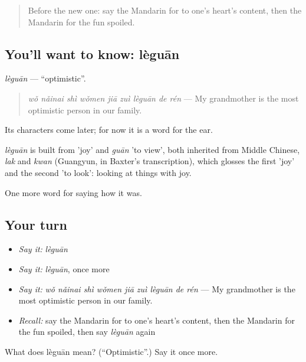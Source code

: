 \begin{quote}
Before the new one: say the Mandarin for to one's heart's content, then the Mandarin for the fun spoiled.
\end{quote}

\subsection*{You'll want to know: lèguān}
\emph{lèguān} — \textquotedblleft{}optimistic\textquotedblright{}.

\begin{quote}
\emph{wǒ nǎinai shì wǒmen jiā zuì lèguān de rén} — My grandmother is the most optimistic person in our family.
\end{quote}

Its characters come later; for now it is a word for the ear.

\begin{cousinweb}
\emph{lèguān} is built from  'joy' and \emph{guān} 'to view', both inherited from Middle Chinese, \emph{lak} and \emph{kwan} (Guangyun, in Baxter's transcription), which glosses the first 'joy' and the second 'to look': looking at things with joy.
\end{cousinweb}

\begin{grammarlens}[title={What you've built}]
One more word for saying how it was.
\end{grammarlens}

\subsection*{Your turn}
\begin{itemize}
\raggedright
  \item \emph{Say it:} \emph{lèguān}
  \item \emph{Say it:} \emph{lèguān}, once more
  \item \emph{Say it:} \emph{wǒ nǎinai shì wǒmen jiā zuì lèguān de rén} — My grandmother is the most optimistic person in our family.
  \item \emph{Recall:} say the Mandarin for to one's heart's content, then the Mandarin for the fun spoiled, then say \emph{lèguān} again
\end{itemize}

\begin{tcolorbox}[breakable,colback=teal!4,colframe=teal!35!black,title={Before you move on}]
What does lèguān mean? (\textquotedblleft{}Optimistic\textquotedblright{}.) Say it once more.
\end{tcolorbox}

